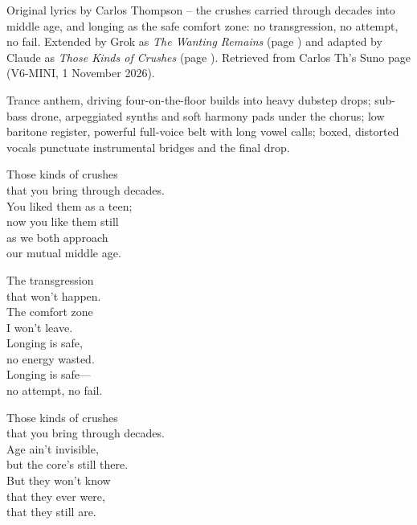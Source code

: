 
\label{sec:longing-is-safe}
\begin{notes}
Original lyrics by Carlos Thompson -- the crushes carried through decades into middle age, and longing as the safe comfort zone: no transgression, no attempt, no fail. Extended by Grok as \emph{The Wanting Remains} (page \pageref{sec:the-wanting-remains}) and adapted by Claude as \emph{Those Kinds of Crushes} (page \pageref{sec:those-kinds-of-crushes}). Retrieved from Carlos Th's Suno page (V6-MINI, 1 November 2026).
\end{notes}
\begin{style}
Trance anthem, driving four-on-the-floor builds into heavy dubstep drops; sub-bass drone, arpeggiated synths and soft harmony pads under the chorus; low baritone register, powerful full-voice belt with long vowel calls; boxed, distorted vocals punctuate instrumental bridges and the final drop.
\end{style}
\begin{lyrics}

Those kinds of crushes\\
that you bring through decades.\\
You liked them as a teen;\\
now you like them still\\
as we both approach\\
our mutual middle age.



The transgression\\
that won’t happen.\\
The comfort zone\\
I won’t leave.\\
Longing is safe,\\
no energy wasted.\\
Longing is safe—\\
no attempt, no fail.



Those kinds of crushes\\
that you bring through decades.\\
Age ain’t invisible,\\
but the core’s still there.\\
But they won’t know\\
that they ever were,\\
that they still are.

\end{lyrics}

